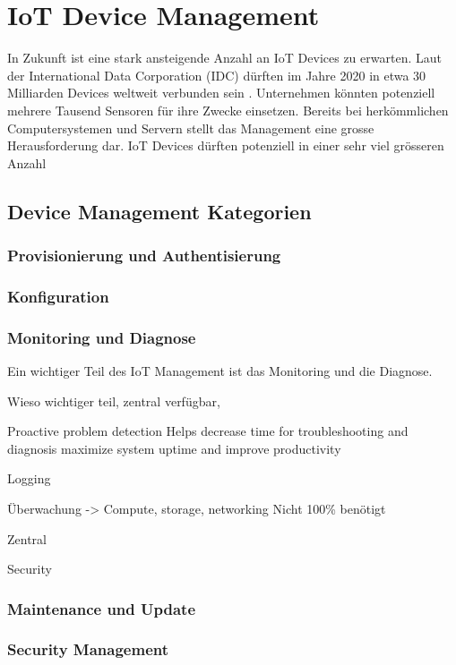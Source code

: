 \chapter{IoT Device Management}
In Zukunft ist eine stark ansteigende Anzahl an IoT Devices zu erwarten. Laut der International Data Corporation (IDC) dürften im Jahre 2020 in etwa 30 Milliarden Devices weltweit verbunden sein \cite{IDC15}. Unternehmen könnten potenziell mehrere Tausend Sensoren für ihre Zwecke einsetzen. Bereits bei herkömmlichen Computersystemen und Servern stellt das Management eine grosse Herausforderung dar. IoT Devices dürften potenziell in einer sehr viel grösseren Anzahl 
\section{Device Management Kategorien}

\subsection{Provisionierung und Authentisierung}
\subsection{Konfiguration}
\subsection{Monitoring und Diagnose}
Ein wichtiger Teil des IoT Management ist das Monitoring und die Diagnose. 


Wieso
wichtiger teil, zentral verfügbar, 





Proactive problem detection 
Helps decrease time for troubleshooting and diagnosis 
maximize system uptime and improve productivity

Logging

Überwachung -> Compute, storage, networking
Nicht 100\% benötigt

Zentral

Security



\subsection{Maintenance und Update}






\subsection{Security Management}



\section{}




















